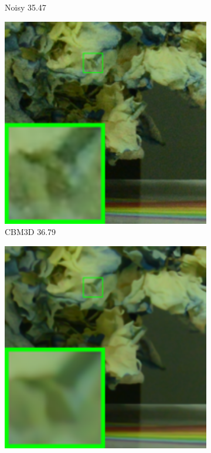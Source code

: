 \begin{figure}
\begin{subfigure}[t]{0.19\textwidth}
		\caption{Noisy 35.47}
    \end{subfigure}
    \hfill
    \begin{subfigure}[t]{0.19\textwidth}
        \centering
        \includegraphics[width=1\textwidth]{images/twsc/cc/resize_br_CBM3D_d800_iso1600_1_real.png}
		\caption{CBM3D 36.79}
    \end{subfigure}
    \hfill
    \begin{subfigure}[t]{0.19\textwidth}
        \centering
        \includegraphics[width=1\textwidth]{images/twsc/cc/resize_br_WNNM_d800_iso1600_1_real.png}

\end{subfigure}
\end{figure}
